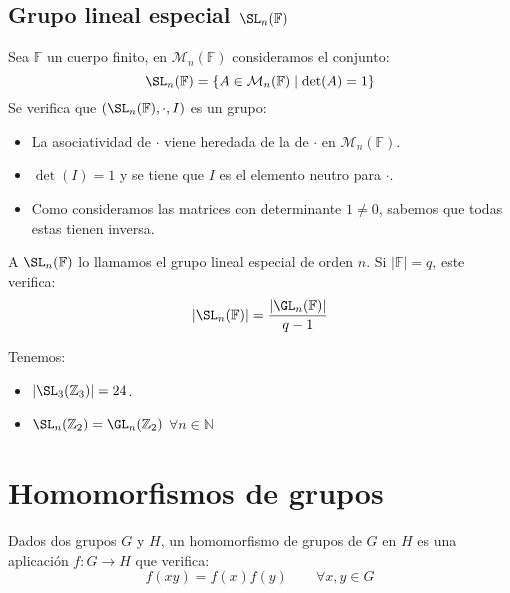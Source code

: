 \subsection{Grupo lineal especial $\SL_n(\mathbb{F})$}
\begin{definicion} Sea $\mathbb{F}$ un cuerpo finito, en $\mathcal{M}_n(\mathbb{F})$ consideramos el conjunto:
    \begin{equation*}
        \SL_n(\mathbb{F}) = \{A\in \mathcal{M}_n(\mathbb{F}) \mid \det(A)=1\}
    \end{equation*}
    Se verifica que $(\SL_n(\mathbb{F}),\cdot,I)$ es un grupo:
    \begin{itemize}
        \item La asociatividad de $\cdot $ viene heredada de la de $\cdot $ en $\mathcal{M}_n(\mathbb{F})$.
        \item $\det(I)=1$ y se tiene que $I$ es el elemento neutro para $\cdot $.
        \item Como consideramos las matrices con determinante $1\neq 0$, sabemos que todas estas tienen inversa.
    \end{itemize}
    A $\SL_n(\mathbb{F})$ lo llamamos el grupo lineal especial de orden $n$. Si $|\mathbb{F}| =q$, este verifica:
    \begin{equation*}
        |\SL_n(\mathbb{F})| = \dfrac{|\GL_n(\mathbb{F})| }{q-1}
    \end{equation*}
\end{definicion}

\begin{ejemplo}
    Tenemos:
    \begin{itemize}
        \item $|\SL_3(\mathbb{Z}_3)| = 24$.
        \item $\SL_n(\mathbb{Z}_2)=\GL_n(\mathbb{Z}_2)$ $\forall n\in \mathbb{N}$
    \end{itemize}
\end{ejemplo}

\section{Homomorfismos de grupos}
\begin{definicion}[Homomorfismo]
    Dados dos grupos $G$ y $H$, un homomorfismo de grupos de $G$ en $H$ es una aplicación $f:G\rightarrow H$ que verifica:
    \begin{equation*}
        f(xy) = f(x)f(y) \qquad \forall x,y\in G
    \end{equation*}
\end{definicion}

